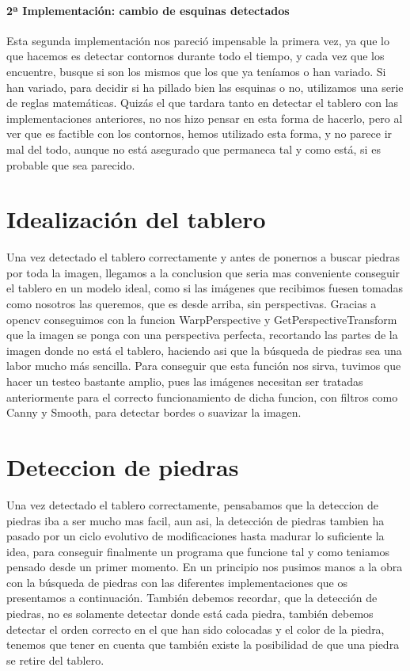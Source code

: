 \documentclass[12pt,a4paper]{report}
\begin{document}
\paragraph{2ª Implementación: cambio de esquinas detectados} 

Esta segunda implementación nos pareció impensable la primera vez, ya que lo que
hacemos es detectar contornos durante todo el tiempo, y cada vez que los
encuentre, busque si son los mismos que los que ya teníamos o han variado. Si
han variado, para decidir si ha pillado bien las esquinas o no, utilizamos una
serie de reglas matemáticas. 
Quizás el que tardara tanto en detectar el tablero con las implementaciones
anteriores, no nos hizo pensar en esta forma de hacerlo, pero al ver que es
factible con los contornos, hemos utilizado esta forma, y no parece ir mal del
todo, aunque no está asegurado que permaneca tal y como está, si es probable que
sea parecido. 

\section{Idealización del tablero} 

Una vez detectado el tablero correctamente y antes de ponernos a buscar piedras
por toda la imagen, llegamos a la conclusion que seria mas conveniente conseguir
el tablero en un modelo ideal, como si las imágenes que recibimos fuesen tomadas
como nosotros las queremos, que es desde arriba, sin perspectivas.  Gracias a
opencv conseguimos con la funcion WarpPerspective y GetPerspectiveTransform que 
la imagen se ponga con una
perspectiva perfecta, recortando las partes de la imagen donde no está el
tablero, haciendo asi que la búsqueda de piedras sea una labor mucho más
sencilla. Para conseguir que esta función nos sirva, tuvimos que hacer un
testeo bastante amplio, pues las imágenes necesitan ser tratadas anteriormente
para el correcto funcionamiento de dicha funcion, con filtros como Canny y
Smooth, para detectar bordes o suavizar la imagen. 

\section{Deteccion de piedras} 

Una vez detectado el tablero correctamente,
pensabamos que la deteccion de piedras iba a ser mucho mas facil, aun asi, la
detección de piedras tambien ha pasado por un ciclo evolutivo de modificaciones
hasta madurar lo suficiente la idea, para conseguir finalmente un programa que
funcione tal y como teniamos pensado desde un primer momento. En un principio
nos pusimos manos a la obra con la búsqueda de piedras con las diferentes
implementaciones que os presentamos a continuación.
También debemos recordar, que la detección de
piedras, no es solamente detectar donde está cada piedra, también debemos
detectar el orden correcto en el que han sido colocadas y el color de la piedra,
tenemos que tener en cuenta que también existe la posibilidad de que una piedra
se retire del tablero. 
\end{document}
